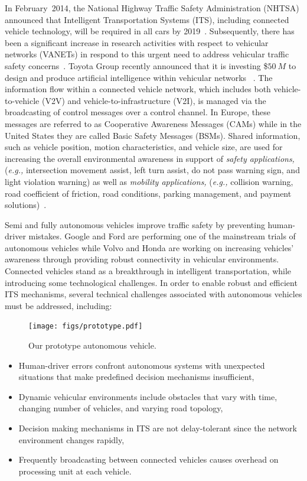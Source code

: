 \documentclass[journal, 11pt]{IEEEtran}
\begin{document}
In February~2014, the National Highway Traffic Safety Administration (NHTSA)
announced that Intelligent Transportation Systems (ITS), including connected
vehicle technology, will be required in all cars by 2019~\cite{factsheet}.
Subsequently, there has been a significant increase in research activities with
respect to vehicular networks (VANETs) in respond to this urgent need to
address vehicular traffic safety concerns~\cite{ntsb}. Toyota Group recently
announced that it is investing \$$50~M$ to design and produce artificial
intelligence within vehicular networks ~\cite{toyota50M}. The information flow
within a connected vehicle network, which includes both vehicle-to-vehicle (V2V)
and vehicle-to-infrastructure (V2I), is managed via the broadcasting of control
messages over a control channel. In Europe, these messages are referred to as
Cooperative Awareness Messages (CAMs) while in the United States they are called
Basic Safety Messages (BSMs). Shared information, such as vehicle position,
motion characteristics, and vehicle size, are used for increasing the overall
environmental awareness in support of \textit{safety applications,}
(\textit{e.g.,} intersection movement assist, left turn assist, do not pass
warning sign, and light violation warning) as well as \textit{mobility
applications,} (\textit{e.g.,} collision warning, road coefficient of friction,
road conditions, parking management, and payment
solutions)~\cite{hardingNHTSA14}.

Semi and fully autonomous vehicles improve traffic safety by preventing
human-driver mistakes. Google and Ford are performing one of the mainstream
trials of autonomous vehicles while Volvo and Honda are working on increasing
vehicles' awareness through providing robust connectivity in vehicular
environments. Connected vehicles stand as a breakthrough in intelligent
transportation, while introducing some technological challenges. In order to
enable robust and efficient ITS mechanisms, several technical challenges
associated with autonomous vehicles must be addressed, including:

\begin{figure}[!t]
  \centering
  \texttt{[image: figs/prototype.pdf]}
  \vspace*{-2mm}
  \caption{{\fontsize{10}{10}\selectfont Our prototype autonomous vehicle.}}
  \label{fig:pareto}
  \vspace*{-6mm}
\end{figure}

\begin{itemize}
\item Human-driver errors confront autonomous systems with unexpected
situations that make predefined decision mechanisms insufficient,
\item Dynamic vehicular environments include obstacles that vary with time,
changing number of vehicles, and varying road topology,
\item Decision making mechanisms in ITS are not delay-tolerant since the network
environment changes rapidly,
\item Frequently broadcasting between connected vehicles causes overhead on
processing unit at each vehicle.
\end{itemize}
\end{document}
